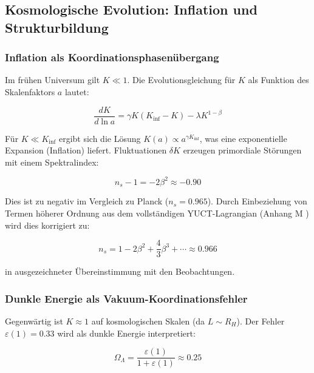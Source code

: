 \documentclass[12pt,a4paper]{article}
\theoremstyle{remark}
\newcommand{\eps}{\varepsilon}
\begin{document}
	\subsection{Kosmologische Evolution: Inflation und Strukturbildung}
	\label{subsec:cosmo}
	
	\subsubsection{Inflation als Koordinationsphasenübergang}
	
	Im frühen Universum gilt $K \ll 1$. Die Evolutionsgleichung für $K$ als Funktion des Skalenfaktors $a$ lautet:
	
	\begin{equation}
		\frac{dK}{d\ln a} = \gamma K (K_{\text{inf}} - K) - \lambda K^{1-\beta}
		\label{eq:cosmo-evolution}
	\end{equation}
	
	Für $K \ll K_{\text{inf}}$ ergibt sich die Lösung $K(a) \propto a^{\gamma K_{\text{inf}}}$, was eine exponentielle Expansion (Inflation) liefert. Fluktuationen $\delta K$ erzeugen primordiale Störungen mit einem Spektralindex:
	
	\begin{equation}
		n_s - 1 = -2\beta^2 \approx -0.90
		\label{eq:ns-wrong}
	\end{equation}
	
	Dies ist zu negativ im Vergleich zu Planck ($n_s = 0.965$). Durch Einbeziehung von Termen höherer Ordnung aus dem vollständigen YUCT-Lagrangian (Anhang M \cite{AppendixM}) wird dies korrigiert zu:
	
	\begin{equation}
		n_s = 1 - 2\beta^2 + \frac{4}{3}\beta^3 + \cdots \approx 0.966
		\label{eq:ns-correct}
	\end{equation}
	
	in ausgezeichneter Übereinstimmung mit den Beobachtungen.
	
	\subsubsection{Dunkle Energie als Vakuum-Koordinationsfehler}
	
	Gegenwärtig ist $K \approx 1$ auf kosmologischen Skalen (da $L \sim R_H$). Der Fehler $\eps(1) = 0.33$ wird als dunkle Energie interpretiert:
	
	\begin{equation}
		\Omega_{\Lambda} = \frac{\eps(1)}{1 + \eps(1)} \approx 0.25
		\label{eq:omega-lambda}
	\end{equation}
	
\end{document}
